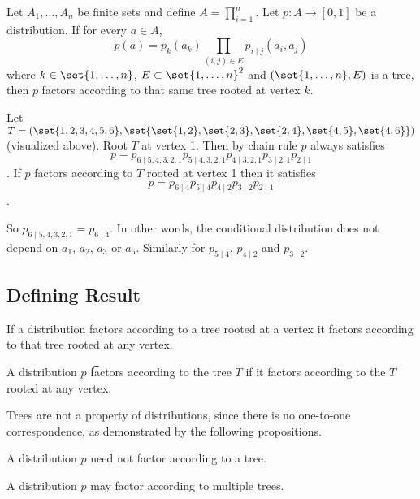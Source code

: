 
Let $A_1, \dots, A_n$ be finite sets and define $A = \prod_{i = 1}^{n}$.
Let $p: A \to [0, 1]$ be a distribution.
If for every $a \in A$, $$p(a) = p_k(a_k)\prod_{(i, j) \in E} p_{i \mid j}(a_i, a_j)$$ where $k \in \set{1, \dots, n}$, $E \subset \set{1, \dots, n}^2$ and $(\set{1, \dots, n}, E)$ is a tree, then $p$ factors according to that same tree rooted at vertex $k$.



Let $T = (\set{1, 2, 3, 4, 5, 6}, \set{\set{1, 2}, \set{2, 3}, \set{2, 4}, \set{4, 5}, \set{4, 6}})$ (visualized above). Root $T$ at vertex 1.
Then by chain rule $p$ always satisfies $$p = p_{6 \mid 5, 4, 3, 2, 1}p_{5 \mid 4, 3, 2, 1}p_{4 \mid 3, 2, 1} p_{3 \mid 2, 1}p_{2 \mid 1}$$.
If $p$ factors according to $T$ rooted at vertex 1 then it satisfies $$p = p_{6 \mid 4}p_{5 \mid 4}p_{4 \mid 2}p_{3 \mid 2}p_{2 \mid 1}$$.

So $p_{6 \mid 5, 4, 3, 2, 1} = p_{6 \mid 4}$. In other words, the conditional distribution does not depend on $a_1$, $a_2$, $a_3$ or $a_5$. Similarly for $p_{5 \mid 4}$, $p_{4 \mid 2}$ and $p_{3 \mid 2}$.

\subsection{Defining Result}
\begin{prop}
If a distribution factors according
to a tree rooted at a vertex it
factors according to that tree rooted
at any vertex.
\end{prop}


A distribution $p$
\t{factors according to the tree}{} $T$
if it factors according to the
$T$ rooted at any vertex.


Trees are not a property of distributions,
since there is no one-to-one correspondence,
as demonstrated by the following propositions.


A distribution $p$ need not factor according to a tree.

A distribution
$p$ may factor according to multiple trees.
\strats
